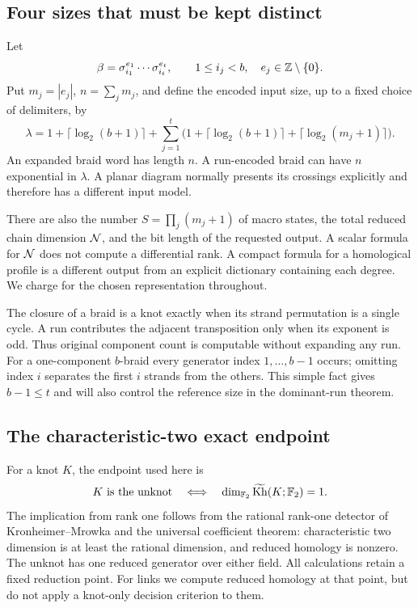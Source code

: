 \subsection{Four sizes that must be kept distinct}

Let
\begin{equation}\label{eq:input}
\beta=\sigma_{i_1}^{e_1}\cdots\sigma_{i_t}^{e_t},\qquad
1\le i_j<b,\quad e_j\in\mathbb Z\setminus\{0\}.
\end{equation}
Put \(m_j=|e_j|\), \(n=\sum_jm_j\), and define the encoded input size,
up to a fixed choice of delimiters, by
\begin{equation}\label{eq:encoded}
\lambda=1+\lceil\log_2(b+1)\rceil+
\sum_{j=1}^t\bigl(1+\lceil\log_2(b+1)\rceil+
                         \lceil\log_2(m_j+1)\rceil\bigr).
\end{equation}
An expanded braid word has length \(n\). A run-encoded braid can have
\(n\) exponential in \(\lambda\). A planar diagram normally presents its
crossings explicitly and therefore has a different input model.

There are also the number \(S=\prod_j(m_j+1)\) of macro states, the total
reduced chain dimension \(\mathcal N\), and the bit length of the requested output.
A scalar formula for \(\mathcal N\) does not compute a differential rank. A
compact formula for a homological profile is a different output from an
explicit dictionary containing each degree. We charge for the chosen
representation throughout.

The closure of a braid is a knot exactly when its strand permutation is a
single cycle. A run contributes the adjacent transposition only when its
exponent is odd. Thus original component count is computable without
expanding any run. For a one-component \(b\)-braid every generator index
\(1,\ldots,b-1\) occurs; omitting index \(i\) separates the first \(i\)
strands from the others. This simple fact gives \(b-1\le t\) and will also
control the reference size in the dominant-run theorem.

\subsection{The characteristic-two exact endpoint}

For a knot \(K\), the endpoint used here is
\begin{equation}\label{eq:detector}
K\text{ is the unknot}\quad\Longleftrightarrow\quad
\dim_{\mathbb F_2}\widetilde{\operatorname{Kh}}(K;\mathbb F_2)=1.
\end{equation}
The implication from rank one follows from the rational rank-one detector
of Kronheimer--Mrowka and the universal coefficient theorem: characteristic
two dimension is at least the rational dimension, and reduced homology is
nonzero. The unknot has one reduced generator over either field.
All calculations retain a fixed reduction point. For links we compute
reduced homology at that point, but do not apply a knot-only decision
criterion to them.

